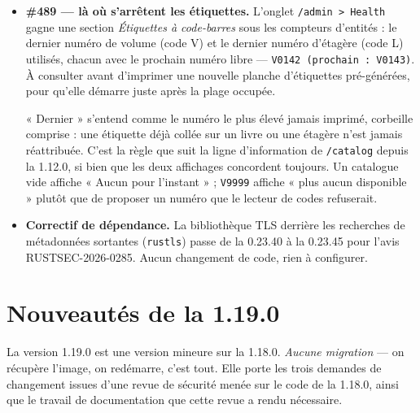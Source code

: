 \begin{itemize}
  \item \textbf{\#489 \string— là où s'arrêtent les étiquettes.}
        L'onglet \texttt{/admin > Health} gagne une section
        \emph{Étiquettes à code-barres} sous les compteurs d'entités :
        le dernier numéro de volume (code V) et le dernier numéro
        d'étagère (code L) utilisés, chacun avec le prochain numéro
        libre --- \texttt{V0142 (prochain : V0143)}. À consulter avant
        d'imprimer une nouvelle planche d'étiquettes pré-générées, pour
        qu'elle démarre juste après la plage occupée.

        « Dernier » s'entend comme le numéro le plus élevé jamais
        imprimé, corbeille comprise : une étiquette déjà collée sur un
        livre ou une étagère n'est jamais réattribuée. C'est la règle
        que suit la ligne d'information de \texttt{/catalog} depuis la
        1.12.0, si bien que les deux affichages concordent toujours. Un
        catalogue vide affiche « Aucun pour l'instant » ; \texttt{V9999}
        affiche « plus aucun disponible » plutôt que de proposer un
        numéro que le lecteur de codes refuserait.
  \item \textbf{Correctif de dépendance.} La bibliothèque TLS derrière
        les recherches de métadonnées sortantes (\texttt{rustls}) passe
        de la 0.23.40 à la 0.23.45 pour l'avis RUSTSEC-2026-0285. Aucun
        changement de code, rien à configurer.
\end{itemize}

\section{Nouveautés de la 1.19.0}\label{sec:whats-new-1.19.0}

La version 1.19.0 est une version mineure sur la 1.18.0.
\emph{Aucune migration} --- on récupère l'image, on redémarre, c'est
tout. Elle porte les trois demandes de changement issues d'une revue de
sécurité menée sur le code de la 1.18.0, ainsi que le travail de
documentation que cette revue a rendu nécessaire.

